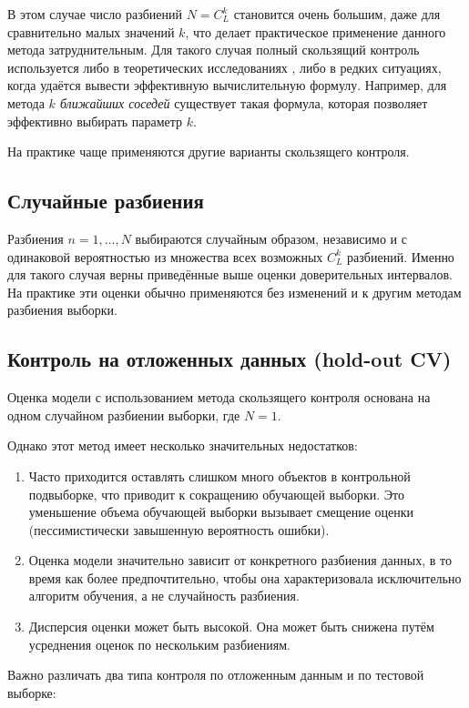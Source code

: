 В этом случае число разбиений $N = C_L^k$ становится очень большим, даже для сравнительно малых значений $k$, что делает практическое применение данного метода затруднительным. Для такого случая полный скользящий контроль используется либо в теоретических исследованиях \cite{Voronov2004}, либо в редких ситуациях, когда удаётся вывести эффективную вычислительную формулу. Например, для метода \textit{$k$ ближайших соседей} существует такая формула, которая позволяет эффективно выбирать параметр $k$.

\medskip
На практике чаще применяются другие варианты скользящего контроля.

\subsection{Случайные разбиения}

Разбиения $n = 1, \ldots, N$ выбираются случайным образом, независимо и с одинаковой вероятностью из множества всех возможных $C_L^k$ разбиений. Именно для такого случая верны приведённые выше оценки доверительных интервалов. На практике эти оценки обычно применяются без изменений и к другим методам разбиения выборки.

\subsection{Контроль на отложенных данных (hold-out CV)}
Оценка модели с использованием метода скользящего контроля основана на одном случайном разбиении выборки, где $N=1$.

Однако этот метод имеет несколько значительных недостатков:

\begin{enumerate}
    \item Часто приходится оставлять слишком много объектов в контрольной подвыборке, что приводит к сокращению обучающей выборки. Это уменьшение объема обучающей выборки вызывает смещение оценки (пессимистически завышенную вероятность ошибки).
    \item Оценка модели значительно зависит от конкретного разбиения данных, в то время как более предпочтительно, чтобы она характеризовала исключительно алгоритм обучения, а не случайность разбиения.
    \item Дисперсия оценки может быть высокой. Она может быть снижена путём усреднения оценок по нескольким разбиениям.
\end{enumerate}

Важно различать два типа контроля по отложенным данным и по тестовой выборке:

